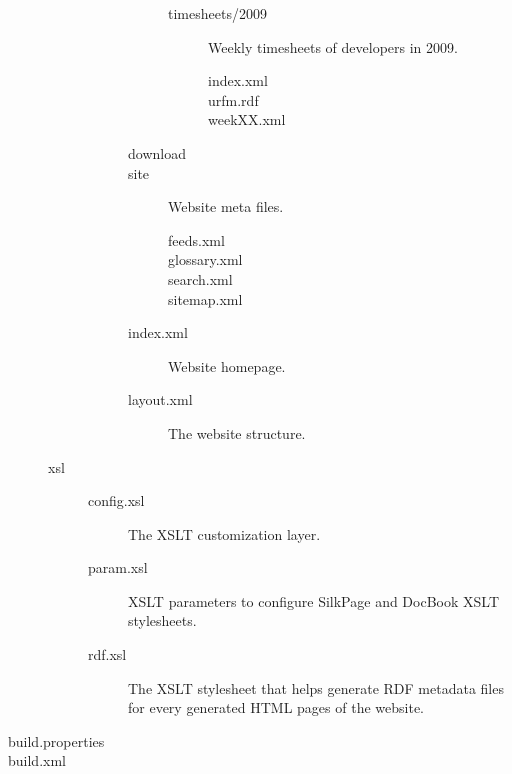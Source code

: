 \begin{description}
\begin{description}
\begin{description}
\begin{description}
\begin{description}
\begin{description}
          \end{description}
        \item[timesheets/2009] Weekly timesheets of developers in 2009.
          \begin{description}
          \item[index.xml]
          \item[urfm.rdf]
          \item[weekXX.xml]
          \end{description}
        \end{description}
      \item[download]
      \item[site] Website meta files.
        \begin{description}
        \item[feeds.xml]
        \item[glossary.xml]
        \item[search.xml]
        \item[sitemap.xml]
        \end{description}
      \item[index.xml] Website homepage.
      \item[layout.xml] The website structure.
      \end{description}
    \end{description}
  \item[xsl]
    \begin{description}
    \item[config.xsl] The XSLT customization layer.
    \item[param.xsl] XSLT parameters to configure SilkPage and DocBook
      XSLT stylesheets.
    \item[rdf.xsl] The XSLT stylesheet that helps generate RDF metadata files 
      for every generated HTML pages of the website.
    \end{description}
  \end{description}
\item[build.properties]
\item[build.xml]
\end{description}